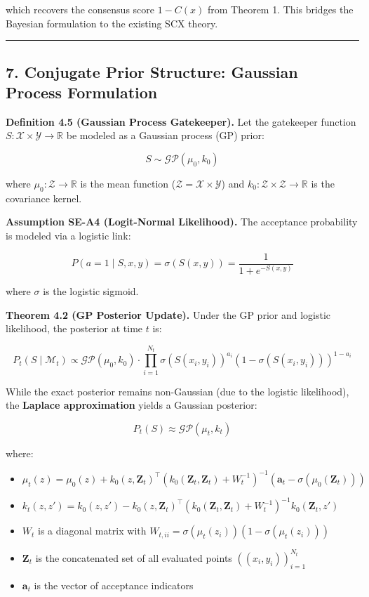 \documentclass[
  12pt,
]{article}
\providecommand{\tightlist}{%
  \setlength{\itemsep}{0pt}\setlength{\parskip}{0pt}}
\begin{document}
which recovers the consensus score \(1 - C(x)\) from Theorem 1. This
bridges the Bayesian formulation to the existing SCX theory.

\begin{center}\rule{0.5\linewidth}{0.5pt}\end{center}

\subsection{7. Conjugate Prior Structure: Gaussian Process
Formulation}\label{conjugate-prior-structure-gaussian-process-formulation}

\textbf{Definition 4.5 (Gaussian Process Gatekeeper).} Let the
gatekeeper function \(S: \mathcal{X} \times \mathcal{Y} \to \mathbb{R}\)
be modeled as a Gaussian process (GP) prior:

\[
S \sim \mathcal{GP}(\mu_0, k_0)
\]

where \(\mu_0: \mathcal{Z} \to \mathbb{R}\) is the mean function
(\(\mathcal{Z} = \mathcal{X} \times \mathcal{Y}\)) and
\(k_0: \mathcal{Z} \times \mathcal{Z} \to \mathbb{R}\) is the covariance
kernel.

\textbf{Assumption SE-A4 (Logit-Normal Likelihood).} The acceptance
probability is modeled via a logistic link:

\[
P(a = 1 \mid S, x, y) = \sigma(S(x,y)) = \frac{1}{1 + e^{-S(x,y)}}
\]

where \(\sigma\) is the logistic sigmoid.

\textbf{Theorem 4.2 (GP Posterior Update).} Under the GP prior and
logistic likelihood, the posterior at time \(t\) is:

\[
P_t(S \mid \mathcal{M}_t) \propto \mathcal{GP}(\mu_0, k_0) \cdot \prod_{i=1}^{N_t} \sigma(S(x_i, y_i))^{a_i} (1 - \sigma(S(x_i, y_i)))^{1-a_i}
\]

While the exact posterior remains non-Gaussian (due to the logistic
likelihood), the \textbf{Laplace approximation} yields a Gaussian
posterior:

\[
P_t(S) \approx \mathcal{GP}(\mu_t, k_t)
\]

where:

\begin{itemize}
\tightlist
\item
  \(\mu_t(z) = \mu_0(z) + k_0(z, \mathbf{Z}_t)^\top (k_0(\mathbf{Z}_t, \mathbf{Z}_t) + W_t^{-1})^{-1} (\mathbf{a}_t - \sigma(\mu_0(\mathbf{Z}_t)))\)
\item
  \(k_t(z, z') = k_0(z, z') - k_0(z, \mathbf{Z}_t)^\top (k_0(\mathbf{Z}_t, \mathbf{Z}_t) + W_t^{-1})^{-1} k_0(\mathbf{Z}_t, z')\)
\item
  \(W_t\) is a diagonal matrix with
  \(W_{t,ii} = \sigma(\mu_t(z_i))(1 - \sigma(\mu_t(z_i)))\)
\item
  \(\mathbf{Z}_t\) is the concatenated set of all evaluated points
  \(((x_i, y_i))_{i=1}^{N_t}\)
\item
  \(\mathbf{a}_t\) is the vector of acceptance indicators
\end{itemize}
\end{document}
